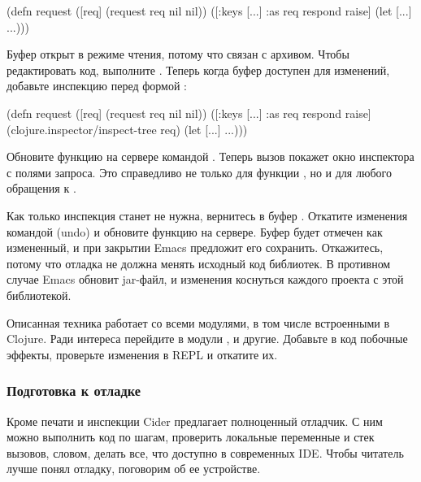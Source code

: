 \begin{english}
  \begin{clojure}
(defn request
  ([req] (request req nil nil))
  ([{:keys [...]
     :as req} respond raise]
   (let [...]
     ...)))
  \end{clojure}
\end{english}

Буфер  открыт в режиме чтения, потому что связан с архивом. Чтобы редактировать код, выполните . Теперь когда буфер доступен для изменений, добавьте инспекцию перед формой :

\begin{english}
  \begin{clojure}
(defn request
  ([req] (request req nil nil))
  ([{:keys [...]
     :as req} respond raise]
   (clojure.inspector/inspect-tree req)
   (let [...]
     ...)))
  \end{clojure}
\end{english}

Обновите функцию на сервере командой . Теперь вызов  покажет окно инспектора с полями запроса. Это справедливо не только для функции , но и для любого обращения к .

Как только инспекция станет не нужна, вернитесь в буфер . Откатите изменения командой  (undo) и обновите функцию на сервере. Буфер  будет отмечен как измененный, и при закрытии Emacs предложит его сохранить. Откажитесь, потому что отладка не должна менять исходный код библиотек. В противном случае Emacs обновит jar-файл, и изменения коснуться каждого проекта с этой библиотекой.

Описанная техника работает со всеми модулями, в том числе встроенными в Clojure. Ради интереса перейдите в модули ,  и другие. Добавьте в код побочные эффекты, проверьте изменения в REPL и откатите их.

\subsubsection{Подготовка к отладке}

Кроме печати и инспекции Cider предлагает полноценный отладчик. С ним можно выполнить код по шагам, проверить локальные переменные и стек вызовов, словом, делать все, что доступно в современных IDE. Чтобы читатель лучше понял отладку, поговорим об ее устройстве.

